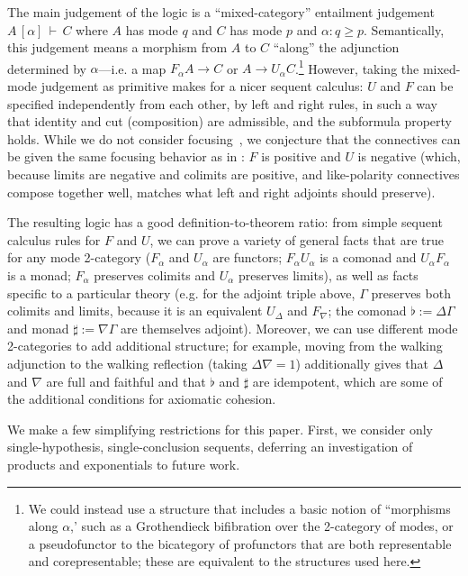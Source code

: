 \documentclass{drl-common/llncs}
\newcommand\seq[3]{\ensuremath{#1 \, [ #2 ] \, \vdash \, #3}}
\begin{document}
The main judgement of the logic is a ``mixed-category'' entailment
judgement \seq{A}{\alpha}{C} where $A$ has mode $q$ and $C$ has mode $p$
and $\alpha : q \ge p$.  Semantically, this judgement means a morphism
from $A$ to $C$ ``along'' the adjunction determined by $\alpha$---i.e. a
map $F_\alpha A \to C$ or $A \to U_\alpha C$.\footnote{We could instead
  use a structure that includes a basic notion of ``morphisms along
  $\alpha$,' such as a Grothendieck bifibration over the 2-category of
  modes, or a pseudofunctor to the bicategory of profunctors that are
  both representable and corepresentable; these are equivalent to the
  structures used here.}  However, taking the mixed-mode judgement as
primitive makes for a nicer sequent calculus: $U$ and $F$ can be
specified independently from each other, by left and right rules, in
such a way that identity and cut (composition) are admissible, and the
subformula property holds.  While we do not consider
focusing~\citep{andreoli92focus}, we conjecture that the connectives can
be given the same focusing behavior as in \citep{reed09adjoint}: $F$ is
positive and $U$ is negative (which, because limits are negative and
colimits are positive, and like-polarity connectives compose together
well, matches what left and right adjoints should preserve).

The resulting logic has a good definition-to-theorem ratio: from 
simple sequent calculus rules for $F$ and $U$, we can prove a variety of
general facts that are true for any mode 2-category ($F_\alpha$ and
$U_\alpha$ are functors; $F_\alpha U_\alpha$ is a comonad and $U_\alpha
F_\alpha$ is a monad; $F_\alpha$ preserves colimits and $U_\alpha$
preserves limits), as well as facts specific to a particular theory
(e.g. for the adjoint triple above, $\Gamma$ preserves both colimits
and limits, because it is an equivalent $U_\Delta$ and $F_\nabla$; the
comonad $\flat := \Delta\Gamma$ and monad $\sharp := \nabla\Gamma$ are
themselves adjoint).  Moreover, we can use different mode 2-categories
to add additional structure; for example, moving from the walking
adjunction to the walking reflection (taking $\Delta \nabla = 1$)
additionally gives that $\Delta$ and $\nabla$ are full and faithful and
that $\flat$ and $\sharp$ are idempotent, which are some of the
additional conditions for axiomatic cohesion.

We make a few simplifying restrictions for this paper. First, we
consider only single-hypothesis, single-conclusion sequents, deferring
an investigation of products and exponentials to future work.
\end{document}
